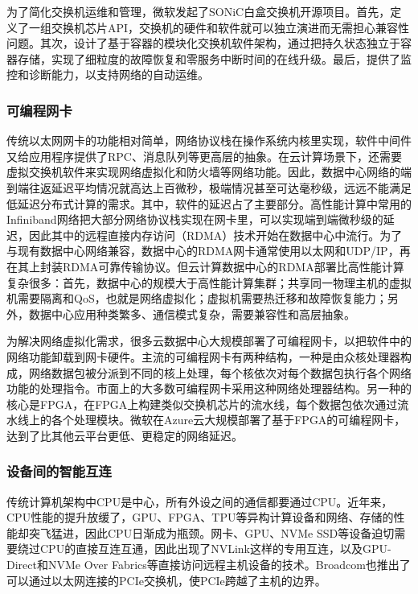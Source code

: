 为了简化交换机运维和管理，微软发起了SONiC白盒交换机开源项目。首先，定义了一组交换机芯片API，交换机的硬件和软件就可以独立演进而无需担心兼容性问题。其次，设计了基于容器的模块化交换机软件架构，通过把持久状态独立于容器存储，实现了细粒度的故障恢复和零服务中断时间的在线升级。最后，提供了监控和诊断能力，以支持网络的自动运维。

\subsubsection{可编程网卡}

传统以太网网卡的功能相对简单，网络协议栈在操作系统内核里实现，软件中间件又给应用程序提供了RPC、消息队列等更高层的抽象。在云计算场景下，还需要虚拟交换机软件来实现网络虚拟化和防火墙等网络功能。因此，数据中心网络的端到端往返延迟平均情况就高达上百微秒，极端情况甚至可达毫秒级，远远不能满足低延迟分布式计算的需求。其中，软件的延迟占了主要部分。高性能计算中常用的Infiniband网络把大部分网络协议栈实现在网卡里，可以实现端到端微秒级的延迟，因此其中的远程直接内存访问（RDMA）技术开始在数据中心中流行。为了与现有数据中心网络兼容，数据中心的RDMA网卡通常使用以太网和UDP/IP，再在其上封装RDMA可靠传输协议。但云计算数据中心的RDMA部署比高性能计算复杂很多：首先，数据中心的规模大于高性能计算集群；共享同一物理主机的虚拟机需要隔离和QoS，也就是网络虚拟化；虚拟机需要热迁移和故障恢复能力；另外，数据中心应用种类繁多、通信模式复杂，需要兼容性和高层抽象。

为解决网络虚拟化需求，很多云数据中心大规模部署了可编程网卡，以把软件中的网络功能卸载到网卡硬件。主流的可编程网卡有两种结构，一种是由众核处理器构成，网络数据包被分派到不同的核上处理，每个核依次对每个数据包执行各个网络功能的处理指令。市面上的大多数可编程网卡采用这种网络处理器结构。另一种的核心是FPGA，在FPGA上构建类似交换机芯片的流水线，每个数据包依次通过流水线上的各个处理模块。微软在Azure云大规模部署了基于FPGA的可编程网卡，达到了比其他云平台更低、更稳定的网络延迟。

\subsubsection{设备间的智能互连}

传统计算机架构中CPU是中心，所有外设之间的通信都要通过CPU。近年来，CPU性能的提升放缓了，GPU、FPGA、TPU等异构计算设备和网络、存储的性能却突飞猛进，因此CPU日渐成为瓶颈。网卡、GPU、NVMe SSD等设备迫切需要绕过CPU的直接互连互通，因此出现了NVLink这样的专用互连，以及GPU-Direct和NVMe Over Fabrics等直接访问远程主机设备的技术。Broadcom也推出了可以通过以太网连接的PCIe交换机，使PCIe跨越了主机的边界。

